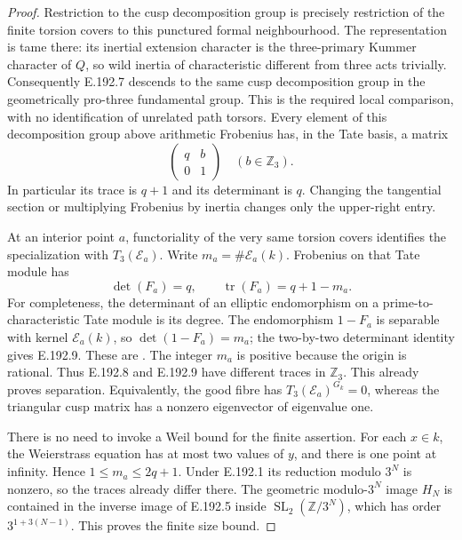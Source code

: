 \begin{proof}
Restriction to the cusp decomposition group is precisely restriction
of the finite torsion covers to this punctured formal neighbourhood.
The representation is tame there: its inertial extension character is
the three-primary Kummer character of \(Q\), so wild inertia of
characteristic different from three acts trivially.  Consequently
E.192.7 descends to the same cusp decomposition group in the
geometrically pro-three fundamental group.  This is the required
local comparison, with no identification of unrelated path torsors.
Every element of this decomposition group above arithmetic Frobenius
has, in the Tate basis, a matrix
\[
                          \begin{pmatrix}q&b\\0&1\end{pmatrix}
                         \quad(b\in\mathbb Z_3).
\tag{E.192.8}
\]
In particular its trace is \(q+1\) and its determinant is \(q\).
Changing the tangential section or multiplying Frobenius by inertia
changes only the upper-right entry.

At an interior point \(a\), functoriality of the very same torsion
covers identifies the specialization with \(T_3(\mathcal E_a)\).
Write \(m_a=\#\mathcal E_a(k)\).  Frobenius on that Tate module has
\[
                 \det(F_a)=q,\qquad
                 \operatorname{tr}(F_a)=q+1-m_a .
\tag{E.192.9}
\]
For completeness, the determinant of an elliptic endomorphism on a
prime-to-characteristic Tate module is its degree.  The endomorphism
\(1-F_a\) is separable with kernel \(\mathcal E_a(k)\), so
\(\det(1-F_a)=m_a\); the two-by-two determinant identity gives
E.192.9.  These are
\citet[III.8, Proposition 8.6, p.99; V.2, Proposition 2.3 and
Theorem 2.3.1, pp.141--143]{AuditSilverman2009}.
The integer \(m_a\) is positive because the origin is rational.
Thus E.192.8 and E.192.9 have different traces in \(\mathbb Z_3\).
This already proves separation.  Equivalently, the good fibre has
\(T_3(\mathcal E_a)^{G_k}=0\), whereas the triangular cusp matrix has
a nonzero eigenvector of eigenvalue one.

There is no need to invoke a Weil bound for the finite assertion.
For each \(x\in k\), the Weierstrass equation has at most two values
of \(y\), and there is one point at infinity.  Hence
\(1\le m_a\le2q+1\).  Under E.192.1 its reduction modulo \(3^N\)
is nonzero, so the traces already differ there.  The geometric
modulo-\(3^N\) image \(H_N\) is contained in the inverse image of
E.192.5 inside \(\operatorname{SL}_2(\mathbb Z/3^N)\), which has order
\(3^{1+3(N-1)}\).  This proves the finite size bound.


\end{proof}
